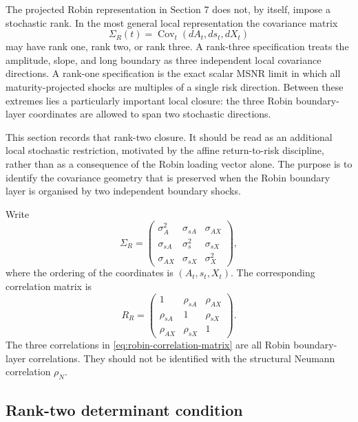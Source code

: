 \documentclass[11pt]{article}
\numberwithin{equation}{section}
\begin{document}
The projected Robin representation in Section 7 does not, by itself, impose a stochastic rank.  In the most general local representation the covariance matrix
\[
        \Sigma_R(t)=\operatorname{Cov}_t(dA_t,ds_t,dX_t)
\]
may have rank one, rank two, or rank three.  A rank-three specification treats the amplitude, slope, and long boundary as three independent local covariance directions.  A rank-one specification is the exact scalar MSNR limit in which all maturity-projected shocks are multiples of a single risk direction.  Between these extremes lies a particularly important local closure: the three Robin boundary-layer coordinates are allowed to span two stochastic directions.

This section records that rank-two closure.  It should be read as an additional local stochastic restriction, motivated by the affine return-to-risk discipline, rather than as a consequence of the Robin loading vector alone.  The purpose is to identify the covariance geometry that is preserved when the Robin boundary layer is organised by two independent boundary shocks.

Write
\begin{equation}
\label{eq:SigmaR-rank-two-general}
        \Sigma_R=
        \begin{pmatrix}
        \sigma_A^2 & \sigma_{sA} & \sigma_{AX}\\
        \sigma_{sA} & \sigma_s^2 & \sigma_{sX}\\
        \sigma_{AX} & \sigma_{sX} & \sigma_X^2
        \end{pmatrix},
\end{equation}
where the ordering of the coordinates is \((A_t,s_t,X_t)\).  The corresponding correlation matrix is
\begin{equation}
\label{eq:robin-correlation-matrix}
        R_R=
        \begin{pmatrix}
        1 & \rho_{sA} & \rho_{AX}\\
        \rho_{sA} & 1 & \rho_{sX}\\
        \rho_{AX} & \rho_{sX} & 1
        \end{pmatrix}.
\end{equation}
The three correlations in \eqref{eq:robin-correlation-matrix} are all Robin boundary-layer correlations.  They should not be identified with the structural Neumann correlation \(\rho_N\).

\subsection{Rank-two determinant condition}
\end{document}
